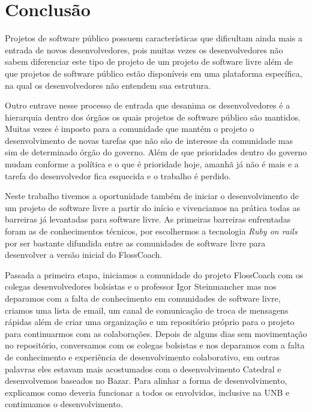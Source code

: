 \chapter{Conclusão}
\label{conclusao}

Projetos de software público possuem características que dificultam ainda mais a entrada de 
novos desenvolvedores, pois muitas vezes os desenvolvedores não sabem 
diferenciar este tipo de projeto de um projeto de software livre além de que
projetos de software público estão disponíveis em uma plataforma específica,
na qual os desenvolvedores não entendem sua estrutura.

Outro entrave nesse processo de entrada que desanima os desenvolvedores
é a hierarquia dentro dos órgãos os quais projetos de software público são 
mantidos. Muitas vezes é imposto para a comunidade que mantém o projeto
o desenvolvimento de novas tarefas que não são de interesse da comunidade
mas sim de determinado órgão do governo. Além de que prioridades dentro do
governo mudam conforme a política e o que é prioridade hoje, amanhã já não é mais
e a tarefa do desenvolvedor fica esquecida e o trabalho é perdido.

Neste trabalho tivemos a oportunidade também de iniciar o desenvolvimento de um
projeto de software livre a partir do início e vivenciamos na prática todas as barreiras
já levantadas para software livre. As primeiras barreiras enfrentadas foram as de
conhecimentos técnicos, por escolhermos a tecnologia \textit{Ruby on rails} por ser
bastante difundida entre as comunidades de software livre para desenvolver a versão inicial 
do FlossCoach.

Passada a primeira etapa, iniciamos a comunidade do projeto FlossCoach com os colegas
desenvolvedores bolsistas e o professor Igor Steinmancher mas nos deparamos com a 
falta de conhecimento em comunidades de software livre, criamos uma lista de email,
um canal de comunicação de troca de mensagens rápidas além de criar uma organização
e um repositório próprio para o projeto para continuarmos com as colaborações.
Depois de alguns dias sem movimentação no repositório, conversamos com os colegas
bolsistas e nos deparamos com a falta de conhecimento e experiência de desenvolvimento colaborativo,
em outras palavras eles estavam mais acostumados com o desenvolvimento Catedral e
desenvolvemos baseados no Bazar. Para alinhar a forma de desenvolvimento, explicamos 
como deveria funcionar a todos os envolvidos, inclusive na UNB e continuamos
o desenvolvimento.

